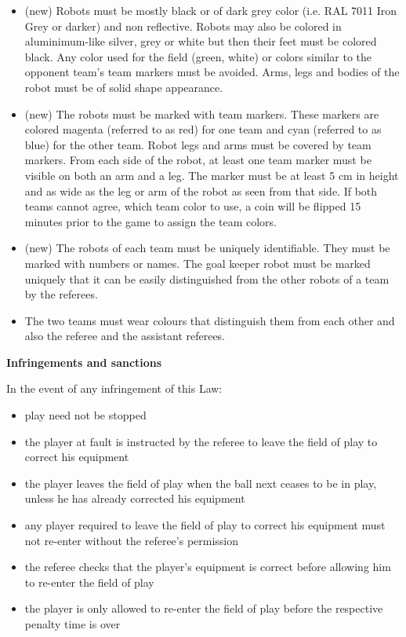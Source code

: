 \begin{itemize}
\item (new) Robots must be mostly black or of dark grey color (i.e. RAL 7011 Iron Grey or darker) and non reflective. Robots may also be colored in aluminimum-like silver, grey or white but then their feet must be colored black. Any color used for the field (green, white) or colors similar to the opponent team's team markers must be avoided. Arms, legs and bodies of the robot must be of solid shape appearance.
\item (new) The robots must be marked with team markers. These markers are colored magenta (referred to as red) for one team and cyan (referred to as blue) for the other team. Robot legs and arms must be covered by team markers. From each side of the robot, at least one team marker must be visible on both an arm and a leg. The marker must be at least 5 cm in height and as wide as the leg or arm of the robot as seen from that side. If both teams cannot agree, which team color to use, a coin will be flipped 15 minutes prior to the game to assign the team colors.
\item (new) The robots of each team must be uniquely identifiable. They must be marked with numbers or names. The goal keeper robot must be marked uniquely that it can be easily distinguished from the other robots of a team by the referees. 
\item The two teams must wear colours that distinguish them from each other and also the referee and the assistant referees.
\end{itemize}

\bigskip

{\bfseries Infringements and sanctions}

\headlinebox

In the event of any infringement of this Law:

\begin{itemize}
\item play need not be stopped
\item the player at fault is instructed by the referee to leave the field of play to correct his equipment
\item the player leaves the field of play when the ball next ceases to be in play, unless he has already corrected his equipment
\item any player required to leave the field of play to correct his equipment must not re-enter without the referee's permission
\item the referee checks that the player's equipment is correct before allowing him to re-enter the field of play 
\item the player is only allowed to re-enter the field of play before the respective penalty time is over 
\end{itemize}


